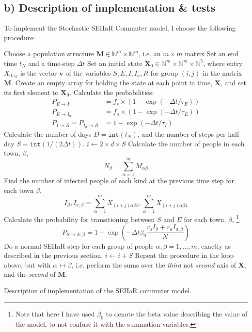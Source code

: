 \subsection{b) Description of implementation \& tests} 

To implement the Stochastic SEIIaR Commuter model, I choose the following procedure: 

\begin{algorithm}[H]
	Choose a population structure $\mathbf{M} \in \mathbb{N}^m \times \mathbb{N}^m$, i.e. an $m\times m$ matrix\;  
	Set an end time $t_N$ and a time-step $\Delta t$\;
	Set an initial state $\mathbf{X}_0 \in \mathbb{N}^m \times \mathbb{N}^m \times \mathbb{N}^5$, where entry $X_{0,ij}$ is the vector $\mathbf{v}$ of the variables $S,E,I,I_a,R$ for group $(i,j)$ in the matrix $\mathbf{M}$.\;
	Create an empty array for holding the state at each point in time, $\mathbf{X}$, and set its first element to $\mathbf{X}_0$.\;
	Calculate the probabilities:
	\begin{align*}
		P_{E\to I} &= f_s \times (1 - \exp{(-\Delta t/\tau_E)}) \\
		P_{E\to I_a} &= f_a \times (1 - \exp{(-\Delta t/\tau_E)}) \\
		P_{I\to R} = P_{I_a\to R} &= 1 - \exp{(-\Delta t/\tau_I)} 
	\end{align*}
	Calculate the number of days $D = \texttt{int}(t_N)$, and the number of steps per half day $S = \texttt{int}(1/(2\Delta t))$.\; 
		{
		$i \gets 2 \times d \times S$\;
			{
			Calculate the number of people in each town, $\beta$,
				$$
				N_\beta = \sum_{\alpha = 1}^{m} M_{\alpha \beta} 
				$$ 
			Find the number of infected people of each kind at the previous time step for each town $\beta$,
				$$
				I_{\beta}, I_{a,\beta} = \sum_{\alpha = 1}^{m} X_{(i+j)\alpha\beta3},  \sum_{\alpha = 1}^{m} X_{(i+j)\alpha\beta4} 
				$$
			Calculate the probability for transitioning between $S$ and $E$ for each town, $\beta$, \footnote{Note that here I have used $\beta_0$ to denote the beta value describing the value of the model, to not confuse it with the summation variables.}
				$$
				P_{S\to E,\beta} = 1 - \exp{\left( - \Delta t \beta_0 \frac{r_s I_{\beta} + r_a I_{a,\beta}}{N}\right)} 
				$$
			}
			Do a normal SEIIaR step for each group of people $\alpha,\beta = 1,\dots,m$, exactly as described in the previous section.\;   
		$i \gets i + S$\;
			{
			Repeat the procedure in the loop above, but with $\alpha \leftrightarrow \beta$, i.e. perform the sums over the \textit{third} not \textit{second} axis of $\mathbf{X}$, and the \textit{second} of $\mathbf{M}$. \;
			}
		}
		\caption{Description of implementation of the SEIIaR commuter model.}
\end{algorithm} 

